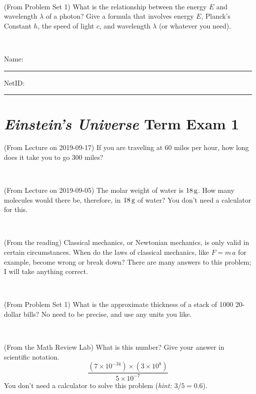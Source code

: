 \documentclass[12pt, letterpaper]{article}
\begin{document}
\vfill ~

\begin{problem} (From Problem Set 1)
What is the relationship between the energy $E$ and wavelength
$\lambda$ of a photon? Give a formula that involves energy $E$,
Planck's Constant $h$, the speed of light $c$, and wavelength
$\lambda$ (or whatever you need).
\end{problem}

\vfill ~


\cleardoublepage



\noindent
Name: \rule[-1ex]{0.60\textwidth}{0.1pt}
NetID: \rule[-1ex]{0.20\textwidth}{0.1pt}

\section*{\textsl{Einstein's Universe} Term Exam 1}
\setcounter{problem}{1}


\begin{problem} (From Lecture on 2019-09-17)
If you are traveling at 60 miles per hour, how long does
it take you to go 300 miles?
\end{problem}


\vfill ~

\begin{problem} (From Lecture on 2019-09-05)
The molar weight of water is $18\,\mathrm{g}$. How many molecules would there
be, therefore, in $18\,\mathrm{g}$ of water? You don't need a calculator for
this.
\end{problem}


\vfill ~

\begin{problem} (From the reading)
Classical mechanics, or Newtonian mechanics, is only valid in certain
circumstances. When do the laws of classical mechanics, like $F =
m\,a$ for example, become wrong or break down? There are many answers
to this problem; I will take anything correct.
\end{problem}


\vfill ~

\begin{problem} (From Problem Set 1)
What is the approximate thickness of a stack of 1000 20-dollar bills?
No need to be precise, and use any units you like.
\end{problem}


\vfill ~


\clearpage


\begin{problem} (From the Math Review Lab)
What is this number? Give your answer in scientific notation.
$$
\frac{(7\times10^{-34})\times(3\times10^8)}{5\times10^{-7}}
$$
You don't need a calculator to solve this problem (\textit{hint: $3/5=0.6$}).
\end{problem}
\end{document}
